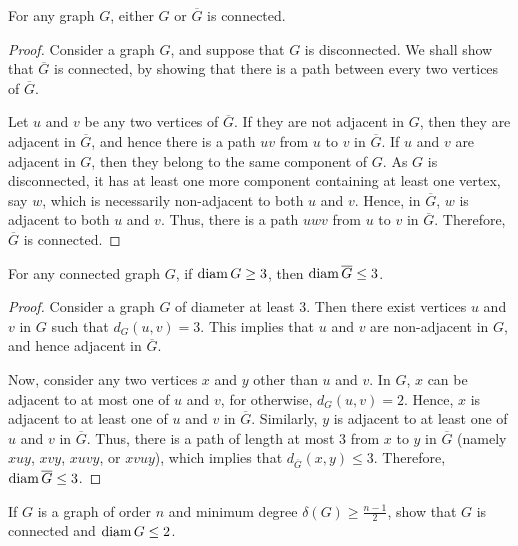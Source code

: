 \begin{Theorem}\label{thm:GorGCompConn}
For any graph $G$, either $G$ or $\overline G$ is connected.
\end{Theorem}

\begin{proof}
Consider a graph $G$, and suppose that $G$ is disconnected. We shall show that $\overline G$ is connected, by showing that there is a path between every two vertices of $\overline G$.

Let $u$ and $v$ be any two vertices of $\overline G$. If they are not adjacent in $G$, then they are adjacent in $\overline G$, and hence there is a path $uv$ from $u$ to $v$ in $\overline G$. If $u$ and $v$ are adjacent in $G$, then they belong to the same component of $G$. As $G$ is disconnected, it has at least one more component containing at least one vertex, say $w$, which is necessarily non-adjacent to both $u$ and $v$. Hence, in $\overline G$, $w$ is adjacent to both $u$ and $v$. Thus, there is a path $uwv$ from $u$ to $v$ in $\overline G$. Therefore, $\overline G$ is connected.
\end{proof}

\begin{Theorem}\label{thm:Diam>=3}
For any connected graph $G$, if $\operatorname{diam} G \ge 3$, then $\operatorname{diam} \overline G \le 3$.
\end{Theorem}

\begin{proof}
Consider a graph $G$ of diameter at least $3$. Then there exist vertices $u$ and $v$ in $G$ such that $d_G(u, v) = 3$. This implies that $u$ and $v$ are non-adjacent in $G$, and hence adjacent in $\overline G$.

Now, consider any two vertices $x$ and $y$ other than $u$ and $v$. In $G$, $x$ can be adjacent to at most one of $u$ and $v$, for otherwise, $d_G(u,v) = 2$. Hence, $x$ is adjacent to at least one of $u$ and $v$ in $\overline G$. Similarly, $y$ is adjacent to at least one of $u$ and $v$ in $\overline G$. Thus, there is a path of length at most $3$ from $x$ to $y$ in $\overline G$ (namely $xuy$, $xvy$, $xuvy$, or $xvuy$), which implies that $d_{\overline G}(x, y) \le 3$. Therefore, $\operatorname{diam} \overline G \le 3$.
\end{proof}

\begin{Theorem}
If $G$ is a graph of order $n$ and minimum degree $\delta(G) \ge \frac{n-1}{2}$, show that $G$ is connected and $\operatorname{diam} G \le 2$.
\end{Theorem}

